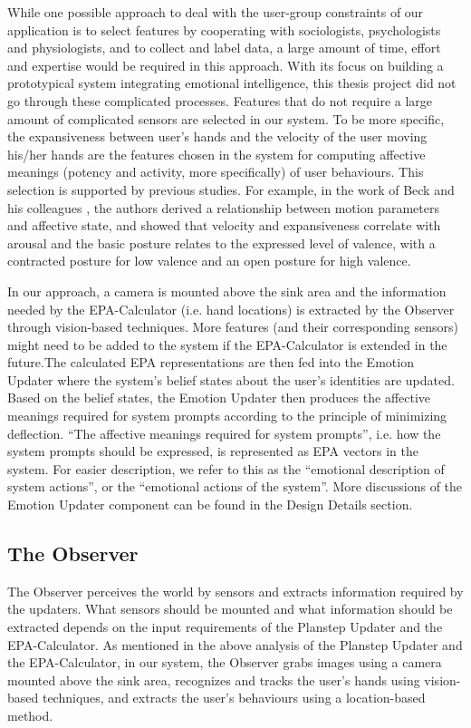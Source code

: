 While one possible approach to deal with the user-group constraints of our application is to select features by cooperating with sociologists, psychologists and physiologists, and to collect and label data, a large amount of time, effort and expertise would be required in this approach. With its focus on building a prototypical system integrating emotional intelligence, this thesis project did not go through these complicated processes. Features that do not require a large amount of complicated sensors are selected in our system. To be more specific, the expansiveness between user's hands and the velocity of the user moving his/her hands are the features chosen in the system for computing affective meanings (potency and activity, more specifically) of user behaviours. This selection is supported by previous studies. For example, in the work of Beck and his colleagues \cite{beck2010interpretation}, the authors derived a relationship between motion parameters and affective state, and showed that velocity and expansiveness correlate with arousal and the basic posture relates to the expressed level of valence, with a contracted posture for low valence and an open posture for high valence.

In our approach, a camera is mounted above the sink area and the information needed by the EPA-Calculator (i.e. hand locations) is extracted by the Observer through vision-based techniques. More features (and their corresponding sensors) might need to be added to the system if the EPA-Calculator is extended in the future.The calculated EPA representations are then fed into the Emotion Updater where the system's belief states about the user's identities are updated. Based on the belief states, the Emotion Updater then produces the affective meanings required for system prompts according to the principle of minimizing deflection. ``The affective meanings required for system prompts'', i.e. how the system prompts should be expressed, is represented as EPA vectors in the system. For easier description, we refer to this as the ``emotional description of system actions'', or the ``emotional actions of the system''. More discussions of the Emotion Updater component can be found in the Design Details section.

\subsection{The Observer}

The Observer perceives the world by sensors and extracts information required by the updaters. What sensors should be mounted and what information should be extracted depends on the input requirements of the Planstep Updater and the EPA-Calculator. As mentioned in the above analysis of the Planstep Updater and the EPA-Calculator, in our system, the Observer grabs images using a camera mounted above the sink area, recognizes and tracks the user's hands using vision-based techniques, and extracts the user's behaviours using a location-based method.

